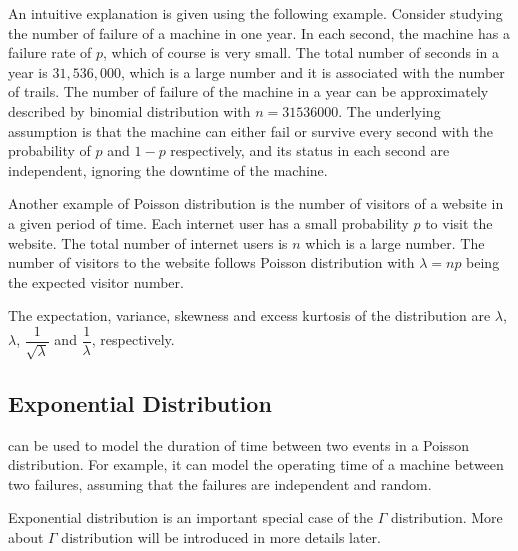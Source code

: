 An intuitive explanation is given using the following example. Consider studying the number of failure of a machine in one year. In each second, the machine has a failure rate of $p$, which of course is very small. The total number of seconds in a year is $31,536,000$, which is a large number and it is associated with the number of trails. The number of failure of the machine in a year can be approximately described by binomial distribution with $n=31536000$. The underlying assumption is that the machine can either fail or survive every second with the probability of $p$ and $1-p$ respectively, and its status in each second are independent, ignoring the downtime of the machine.

Another example of Poisson distribution is the number of visitors of a website in a given period of time. Each internet user has a small probability $p$ to visit the website. The total number of internet users is $n$ which is a large number. The number of visitors to the website follows Poisson distribution with $\lambda=np$ being the expected visitor number.

The expectation, variance, skewness and excess kurtosis of the distribution are $\lambda$, $\lambda$, $\dfrac{1}{\sqrt{\lambda}}$ and $\dfrac{1}{\lambda}$, respectively.

\subsection{Exponential Distribution} \label{sec:exponential_distribution}

 can be used to model the duration of time between two events in a Poisson distribution. For example, it can model the operating time of a machine between two failures, assuming that the failures are independent and random.

Exponential distribution is an important special case of the $\Gamma$ distribution. More about $\Gamma$ distribution will be introduced in more details later.

